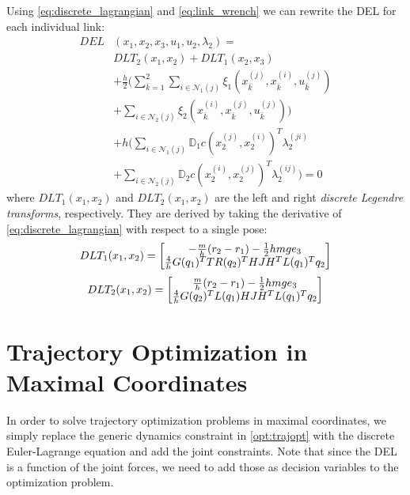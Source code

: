 \documentclass[conference]{IEEEtran}
\begin{document}
Using \eqref{eq:discrete_lagrangian} and \eqref{eq:link_wrench} we can rewrite the DEL for
each individual link:
\begin{equation}
\begin{aligned}
    DEL&(x_1, x_2, x_3, u_1, u_2, \lambda_2) = \\
    &DLT_2(x_1, x_2) + DLT_1(x_2, x_3) \\
    &+ \frac{h}{2} \Bigg( \sum_{\bar{k} = 1}^{2} 
        \sum_{i \in \mathcal{N}_1(j)} \xi_1\left(x_{\bar{k}}^{(j)}, x_{\bar{k}}^{(i)}, u_{\bar{k}}^{(j)}\right) \\
    & + \sum_{i \in \mathcal{N}_2(j)} \xi_2\left(x_{\bar{k}}^{(i)}, x_{\bar{k}}^{(j)}, u_{\bar{k}}^{(j)}\right)
    \Bigg) \\
    & + h \bigg( \sum_{i \in \mathcal{N}_1(j)} \mathbb{D}_1 c\left(x_2^{(j)}, x_2^{(i)}\right)^T \lambda_2^{(ji)} \\
    & +         \sum_{i \in \mathcal{N}_2(j)} \mathbb{D}_2 c\left(x_2^{(i)}, x_2^{(j)}\right)^T \lambda_2^{(ij)} \bigg) = 0
\end{aligned}
\end{equation}
where $DLT_1(x_1, x_2)$ and $DLT_2(x_1, x_2)$ are the left and right 
\textit{discrete Legendre transforms}, respectively. They are derived by taking the 
derivative of \eqref{eq:discrete_lagrangian} with respect to a single pose:
\begin{equation}
    DLT_1(x_1, x_2) = \begin{bmatrix}
        -\frac{m}{h} (r_2 - r_1) - \frac{1}{2} h m g e_3 \\
        \frac{4}{h} G(q_1)^T T R(q_2)^T H J H^T L(q_1)^T q_2
    \end{bmatrix}
\end{equation}
\begin{equation} \label{eq:DEL_single}
    DLT_2(x_1, x_2) = \begin{bmatrix}
        \frac{m}{h} (r_2 - r_1) - \half h m g e_3 \\
        \frac{4}{h} G(q_2)^T L(q_1) H J H^T L(q_1)^T q_2
    \end{bmatrix}
\end{equation}

\section{Trajectory Optimization in Maximal Coordinates}
In order to solve trajectory optimization problems in maximal coordinates, we simply 
replace the generic dynamics constraint in \eqref{opt:trajopt} with the discrete 
Euler-Lagrange equation and add the joint constraints. Note that since the DEL is a function
of the joint forces, we need to add those as decision variables to the optimization problem.
\end{document}
